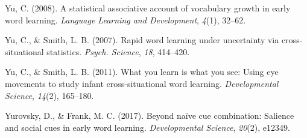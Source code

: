 \documentclass[10pt, letterpaper]{article}
\newenvironment{CSLReferences}%
  {}%
  {\par}
\begin{document}
\begin{CSLReferences}{1}{0}
\leavevmode{}%
Yu, C. (2008). A statistical associative account of vocabulary growth in
early word learning. \emph{Language Learning and Development},
\emph{4}(1), 32--62.

\leavevmode{}%
Yu, C., \& Smith, L. B. (2007). {Rapid word learning under uncertainty
via cross-situational statistics}. \emph{Psych. Science}, \emph{18},
414--420.

\leavevmode{}%
Yu, C., \& Smith, L. B. (2011). What you learn is what you see: Using
eye movements to study infant cross-situational word learning.
\emph{Developmental Science}, \emph{14}(2), 165--180.

\leavevmode{}%
Yurovsky, D., \& Frank, M. C. (2017). Beyond naïve cue combination:
Salience and social cues in early word learning. \emph{Developmental
Science}, \emph{20}(2), e12349.

\end{CSLReferences}

\setlength{\parindent}{-0.1in} 
\setlength{\leftskip}{0.125in}

\noindent


\end{document}
